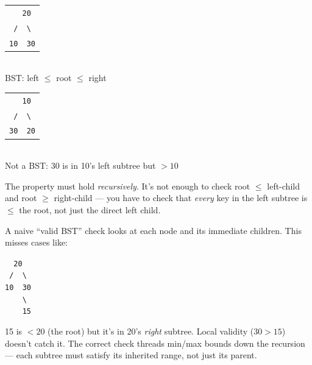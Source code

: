 \documentclass[11pt]{article}
\begin{document}
\begin{center}
\begin{minipage}[t]{0.4\linewidth}\centering
\begin{tabular}{c}
\texttt{\ \ 20} \\
\texttt{\ / \ \textbackslash{}\ } \\
\texttt{10\ \ 30} \\
\end{tabular}\\[0.3em]
BST: left $\leq$ root $\leq$ right
\end{minipage}%
\hfill
\begin{minipage}[t]{0.4\linewidth}\centering
\begin{tabular}{c}
\texttt{\ \ 10} \\
\texttt{\ / \ \textbackslash{}\ } \\
\texttt{30\ \ 20} \\
\end{tabular}\\[0.3em]
Not a BST: 30 is in 10's left subtree but $> 10$
\end{minipage}
\end{center}

The property must hold \emph{recursively}. It's not enough to
check root $\leq$ left-child and root $\geq$ right-child --- you
have to check that \emph{every} key in the left subtree is
$\leq$ the root, not just the direct left child.

\begin{warnbox}
A naive ``valid BST'' check looks at each node and its immediate
children. This misses cases like:
\begin{center}
\texttt{\ \ 20}\\
\texttt{\ / \ \textbackslash{}}\\
\texttt{10\ \ 30}\\
\texttt{\ \ \ \ \textbackslash{}}\\
\texttt{\ \ \ \ 15}
\end{center}
15 is $< 20$ (the root) but it's in 20's \emph{right} subtree.
Local validity ($30 > 15$) doesn't catch it. The correct check
threads min/max bounds down the recursion --- each subtree must
satisfy its inherited range, not just its parent.
\end{warnbox}
\end{document}
